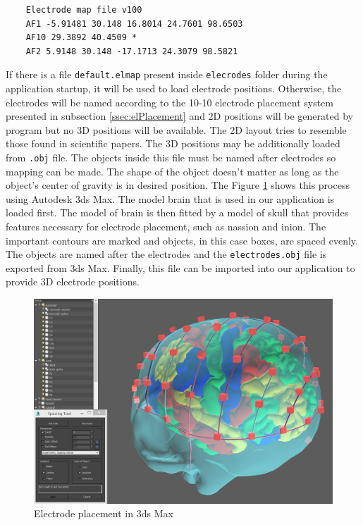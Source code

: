 \lstset{captionpos=b, caption=Electrode map file example, label=lst:ElMap}
\begin{lstlisting}
    Electrode map file v100
    AF1 -5.91481 30.148 16.8014 24.7601 98.6503
    AF10 29.3892 40.4509 *
    AF2 5.9148 30.148 -17.1713 24.3079 98.5821
\end{lstlisting}

If there is a file \texttt{default.elmap} present inside \texttt{elecrodes} folder during the application startup, it will be used to load electrode positions. Otherwise, the electrodes will be named according to the 10-10 electrode placement system presented in subsection \ref{ssec:elPlacement} and 2D positions will be generated by program but no 3D positions will be available. The 2D layout tries to resemble those found in scientific papers. The 3D positions may be additionally loaded from \texttt{.obj} file. The objects inside this file must be named after electrodes so mapping can be made. The shape of the object doesn't matter as long as the object's center of gravity is in desired position. The Figure \ref{fig:3DSMaxPlacement} shows this process using Autodesk 3ds Max. The model brain that is used in our application is loaded first. The model of brain is then fitted by a model of skull that provides features necessary for electrode placement, such as nassion and inion. The important contours are marked and objects, in this case boxes, are spaced evenly. The objects are named after the electrodes and the \texttt{electrodes.obj} file is exported from 3ds Max. Finally, this file can be imported into our application to provide 3D electrode positions.

\begin{figure}[ht]
	\centering
	\includegraphics[width=1\linewidth]{fig/3DSMaxPlacement.jpg}
	\caption{Electrode placement in 3ds Max}
	\label{fig:3DSMaxPlacement}
\end{figure}

